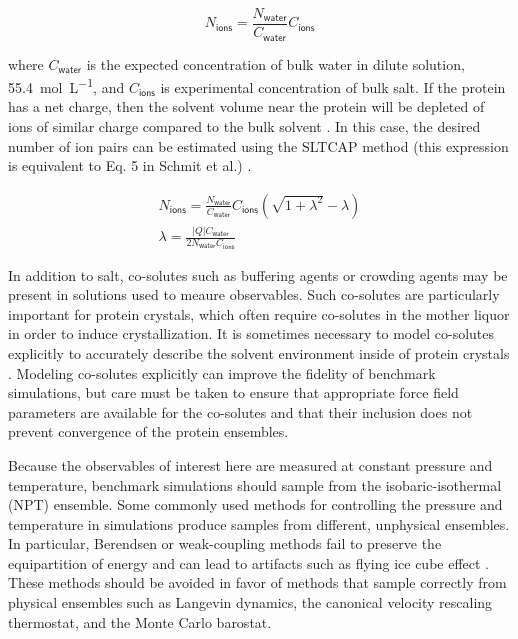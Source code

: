 \documentclass[9pt,review]{livecoms}
\begin{document}
\begin{equation}
\label{eqn:ions_neutral}
N_{\mathsf{ions}} = \frac {N_{\mathsf{water}}} {C_{\mathsf{water}}} C_{\mathsf{ions}}
\end{equation}

\noindent where $C_{\mathsf{water}}$ is the expected concentration of bulk water in dilute solution, \qty{55.4}{\mol\per\liter}, and $C_{\mathsf{ions}}$ is experimental concentration of bulk salt.
If the protein has a net charge, then the solvent volume near the protein will be depleted of ions of similar charge compared to the bulk solvent \cite{schmit_sltcap_2018}.
In this case, the desired number of ion pairs can be estimated using the SLTCAP method (this expression is equivalent to Eq. 5 in Schmit et al.) \cite{schmit_sltcap_2018}.

\begin{equation}
\label{eqn:ions_charged}
\begin{gathered}
N_{\mathsf{ions}} = \frac {N_{\mathsf{water}}} {C_{\mathsf{water}}} C_{\mathsf{ions}} \left( \sqrt{1 + \lambda^2} - \lambda \right) \\
\lambda = \frac {\left| Q \right| C_{\mathsf{water}}} {2 N_{\mathsf{water}} C_{\mathsf{ions}}}
\end{gathered}
\end{equation}

In addition to salt, co-solutes such as buffering agents or crowding agents may be present in solutions used to meaure observables.
Such co-solutes are particularly important for protein crystals, which often require co-solutes in the mother liquor in order to induce crystallization.
It is sometimes necessary to model co-solutes explicitly to accurately describe the solvent environment inside of protein crystals \cite{wall_biomolecular_2019}.
Modeling co-solutes explicitly can improve the fidelity of benchmark simulations, but care must be taken to ensure that appropriate force field parameters are available for the co-solutes and that their inclusion does not prevent convergence of the protein ensembles.

Because the observables of interest here are measured at constant pressure and temperature, benchmark simulations should sample from the isobaric-isothermal (NPT) ensemble.
Some commonly used methods for controlling the pressure and temperature in simulations produce samples from different, unphysical ensembles.
In particular, Berendsen or weak-coupling methods fail to preserve the equipartition of energy and can lead to artifacts such as flying ice cube effect \cite{harvey_flying_1998,braun_anomalous_2018}.
These methods should be avoided in favor of methods that sample correctly from physical ensembles such as Langevin dynamics, the canonical velocity rescaling thermostat, and the Monte Carlo barostat.
\end{document}
